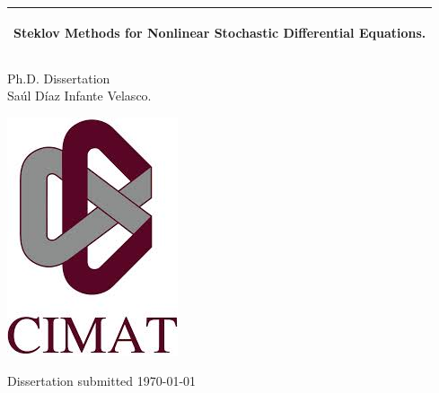 %
\begin{titlepage}
	\addtolength{\hoffset}{0.5\evensidemargin-0.5\oddsidemargin}
	\noindent%
	\begin{tabular}{@{}p{\textwidth}@{}}
		\toprule[2pt]
		\midrule
		\vspace{0.2cm}
		\begin{center}
			\Huge{\textbf{
					Steklov Methods for Nonlinear Stochastic Differential Equations.
				}
			}
		\end{center}
		\vspace{0.2cm}\\
		\midrule
		\toprule[2pt]
	\end{tabular}
	\vspace{3 cm}
	\begin{center}
		{
			\large
				Ph.D. Dissertation%
		}\\
		\vspace{0.2cm}
		{
			\Large
			Sa\'ul D\'iaz Infante Velasco.
		}
		\end{center}
		\begin{center}
			\includegraphics{frontmatter/Logo}
		\end{center}

		\vfill
	\begin{center}
		Dissertation submitted \today
	\end{center}
	\end{titlepage}
	\clearpage
